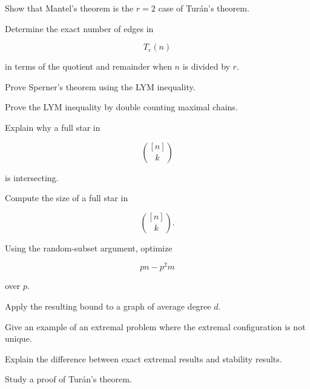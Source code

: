 \begin{exercise}[3]
Show that Mantel's theorem is the \(r=2\) case of Tur\'an's theorem.
\end{exercise}

\begin{exercise}[3]
Determine the exact number of edges in

\[
T_r(n)
\]

in terms of the quotient and remainder when \(n\) is divided by \(r\).
\end{exercise}

\begin{exercise}[3]
Prove Sperner's theorem using the LYM inequality.
\end{exercise}

\begin{exercise}[3]
Prove the LYM inequality by double counting maximal chains.
\end{exercise}

\begin{exercise}[3]
Explain why a full star in

\[
\binom{[n]}{k}
\]

is intersecting.
\end{exercise}

\begin{exercise}[3]
Compute the size of a full star in

\[
\binom{[n]}{k}.
\]
\end{exercise}

\begin{exercise}[3]
Using the random-subset argument, optimize

\[
pn-p^2m
\]

over \(p\).
\end{exercise}

\begin{exercise}[3]
Apply the resulting bound to a graph of average degree \(d\).
\end{exercise}

\begin{exercise}[3]
Give an example of an extremal problem where the extremal configuration
is not unique.
\end{exercise}

\begin{exercise}[3]
Explain the difference between exact extremal results and stability
results.
\end{exercise}

\begin{exercise}[4]
Study a proof of Tur\'an's theorem.
\end{exercise}

